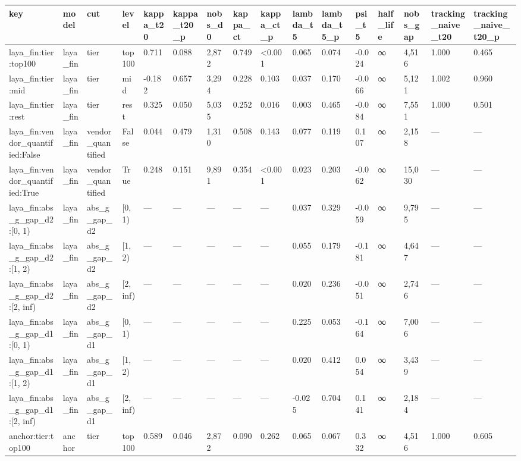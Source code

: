 \begin{tabular}{llllllllllllllll}
\toprule
key & model & cut & level & kappa\_t20 & kappa\_t20\_p & nobs\_d0 & kappa\_ct & kappa\_ct\_p & lambda\_t5 & lambda\_t5\_p & psi\_t5 & half\_life & nobs\_gap & tracking\_naive\_t20 & tracking\_naive\_t20\_p \\
\midrule
laya\_fin:tier:top100 & laya\_fin & tier & top100 & 0.711 & 0.088 & 2,872 & 0.749 & <0.001 & 0.065 & 0.074 & -0.024 & ∞ & 4,516 & 1.000 & 0.465 \\
laya\_fin:tier:mid & laya\_fin & tier & mid & -0.182 & 0.657 & 3,294 & 0.228 & 0.103 & 0.037 & 0.170 & -0.066 & ∞ & 5,121 & 1.002 & 0.960 \\
laya\_fin:tier:rest & laya\_fin & tier & rest & 0.325 & 0.050 & 5,035 & 0.252 & 0.016 & 0.003 & 0.465 & -0.084 & ∞ & 7,551 & 1.000 & 0.501 \\
laya\_fin:vendor\_quantified:False & laya\_fin & vendor\_quantified & False & 0.044 & 0.479 & 1,310 & 0.508 & 0.143 & 0.077 & 0.119 & 0.107 & ∞ & 2,158 & — & — \\
laya\_fin:vendor\_quantified:True & laya\_fin & vendor\_quantified & True & 0.248 & 0.151 & 9,891 & 0.354 & <0.001 & 0.023 & 0.203 & -0.062 & ∞ & 15,030 & — & — \\
laya\_fin:abs\_g\_gap\_d2:[0, 1) & laya\_fin & abs\_g\_gap\_d2 & [0, 1) & — & — & — & — & — & 0.037 & 0.329 & -0.059 & ∞ & 9,795 & — & — \\
laya\_fin:abs\_g\_gap\_d2:[1, 2) & laya\_fin & abs\_g\_gap\_d2 & [1, 2) & — & — & — & — & — & 0.055 & 0.179 & -0.181 & ∞ & 4,647 & — & — \\
laya\_fin:abs\_g\_gap\_d2:[2, inf) & laya\_fin & abs\_g\_gap\_d2 & [2, inf) & — & — & — & — & — & 0.020 & 0.236 & -0.051 & ∞ & 2,746 & — & — \\
laya\_fin:abs\_g\_gap\_d1:[0, 1) & laya\_fin & abs\_g\_gap\_d1 & [0, 1) & — & — & — & — & — & 0.225 & 0.053 & -0.164 & ∞ & 7,006 & — & — \\
laya\_fin:abs\_g\_gap\_d1:[1, 2) & laya\_fin & abs\_g\_gap\_d1 & [1, 2) & — & — & — & — & — & 0.020 & 0.412 & 0.054 & ∞ & 3,439 & — & — \\
laya\_fin:abs\_g\_gap\_d1:[2, inf) & laya\_fin & abs\_g\_gap\_d1 & [2, inf) & — & — & — & — & — & -0.025 & 0.704 & 0.141 & ∞ & 2,184 & — & — \\
anchor:tier:top100 & anchor & tier & top100 & 0.589 & 0.046 & 2,872 & 0.090 & 0.262 & 0.065 & 0.067 & 0.332 & ∞ & 4,516 & 1.000 & 0.605 \\

\end{tabular}
